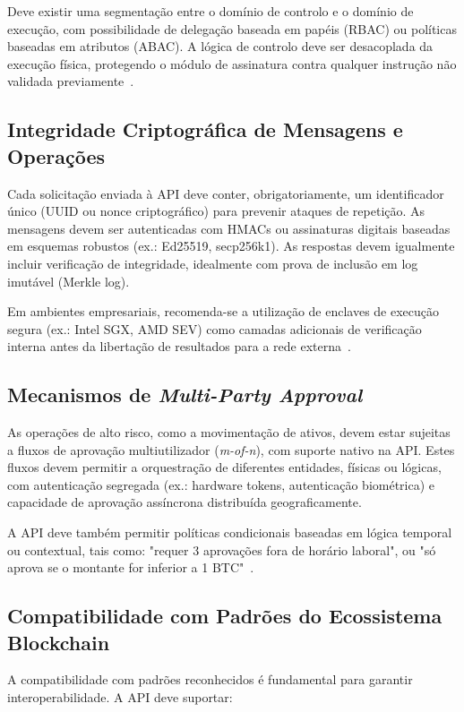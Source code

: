 Deve existir uma segmentação entre o domínio de controlo e o domínio de execução, com possibilidade de delegação baseada em papéis (RBAC) ou políticas baseadas em atributos (ABAC). A lógica de controlo deve ser desacoplada da execução física, protegendo o módulo de assinatura contra qualquer instrução não validada previamente~\cite{nist800-53}.

\subsection{Integridade Criptográfica de Mensagens e Operações}
Cada solicitação enviada à API deve conter, obrigatoriamente, um identificador único (UUID ou nonce criptográfico) para prevenir ataques de repetição. As mensagens devem ser autenticadas com HMACs ou assinaturas digitais baseadas em esquemas robustos (ex.: Ed25519, secp256k1). As respostas devem igualmente incluir verificação de integridade, idealmente com prova de inclusão em log imutável (Merkle log).

Em ambientes empresariais, recomenda-se a utilização de enclaves de execução segura (ex.: Intel SGX, AMD SEV) como camadas adicionais de verificação interna antes da libertação de resultados para a rede externa~\cite{anchorage2023, boneh2019}.

\subsection{Mecanismos de \textit{Multi-Party Approval}}
As operações de alto risco, como a movimentação de ativos, devem estar sujeitas a fluxos de aprovação multiutilizador (\textit{m-of-n}), com suporte nativo na API. Estes fluxos devem permitir a orquestração de diferentes entidades, físicas ou lógicas, com autenticação segregada (ex.: hardware tokens, autenticação biométrica) e capacidade de aprovação assíncrona distribuída geograficamente.

A API deve também permitir políticas condicionais baseadas em lógica temporal ou contextual, tais como: "requer 3 aprovações fora de horário laboral", ou "só aprova se o montante for inferior a 1 BTC"~\cite{bonneau2015, newman2015}.

\subsection{Compatibilidade com Padrões do Ecossistema Blockchain}
A compatibilidade com padrões reconhecidos é fundamental para garantir interoperabilidade. A API deve suportar:

